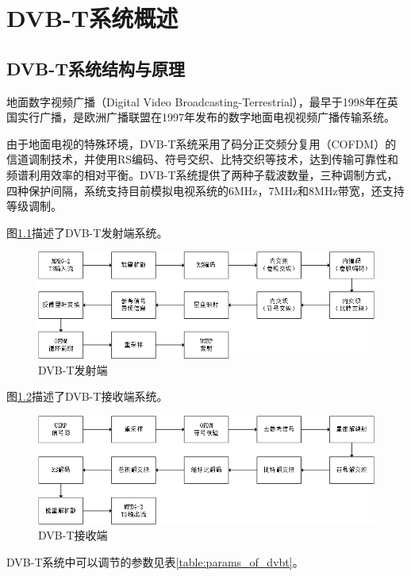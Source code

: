 \chapter{DVB-T系统概述}
	\section{DVB-T系统结构与原理}
	\label{sec:dvbt_summary}
		\par 地面数字视频广播（Digital Video Broadcasting-Terrestrial），最早于1998年在英国实行广播，是欧洲广播联盟在1997年发布的数字地面电视视频广播传输系统。
		\par 由于地面电视的特殊环境，DVB-T系统采用了码分正交频分复用（COFDM）的信道调制技术，并使用RS编码、符号交织、比特交织等技术，达到传输可靠性和频谱利用效率的相对平衡。DVB-T系统提供了两种子载波数量，三种调制方式，四种保护间隔，系统支持目前模拟电视系统的6MHz，7MHz和8MHz带宽，还支持等级调制。
		\par 图\ref{fig:dvbt_tx}描述了DVB-T发射端系统。
		\begin{figure}[htp]
			\centering
			\includegraphics[width=13cm]{figures/dvbt_tx.png}
			\caption{DVB-T发射端}
			\label{fig:dvbt_tx}
		\end{figure}
		\par 图\ref{fig:dvbt_rx}描述了DVB-T接收端系统。
		\begin{figure}[htp]
			\centering
			\includegraphics[width=13cm]{figures/dvbt_rx.png}
			\caption{DVB-T接收端}
			\label{fig:dvbt_rx}
		\end{figure}
		\par DVB-T系统中可以调节的参数见表\ref{table:params_of_dvbt}。
